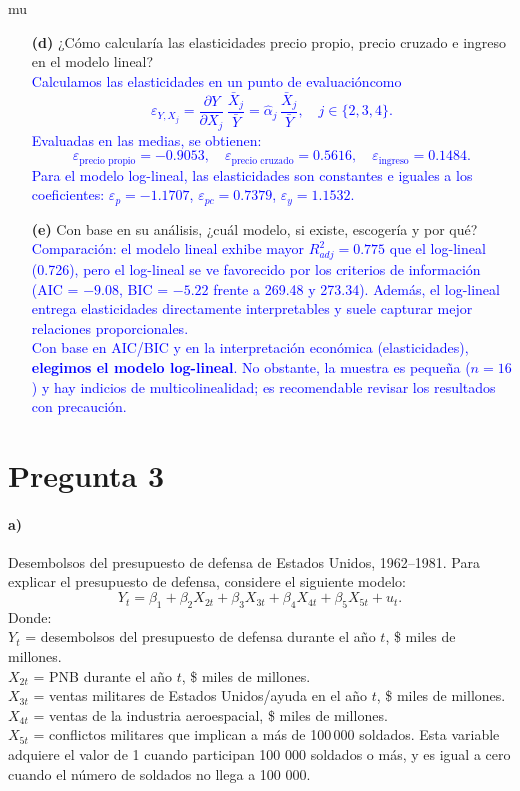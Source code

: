 mu\documentclass[10pt]{article}
\begin{document}
\begin{enumerate}
    \item[\textbf{(d)}] ¿Cómo calcularía las elasticidades precio propio, precio cruzado e ingreso en el modelo lineal?\\
    \textcolor{blue}{
        Calculamos las elasticidades en un punto de evaluacióncomo
        \[
        \varepsilon_{Y,X_j}= \frac{\partial Y}{\partial X_j}\,\frac{\bar X_j}{\bar Y}=\hat{\alpha}_j\,\frac{\bar X_j}{\bar Y},\quad j\in\{2,3,4\}.
        \]
        Evaluadas en las medias, se obtienen:
        \[
        \varepsilon_{\text{precio propio}}=-0.9053,\quad \varepsilon_{\text{precio cruzado}}=0.5616,\quad \varepsilon_{\text{ingreso}}=0.1484.
        \]
        Para el modelo log-lineal, las elasticidades son constantes e iguales a los coeficientes: \(\varepsilon_{p}=-1.1707\), \(\varepsilon_{pc}=0.7379\), \(\varepsilon_{y}=1.1532\).
    }
    
    \item[\textbf{(e)}] Con base en su análisis, ¿cuál modelo, si existe, escogería y por qué?\\
    \textcolor{blue}{
        Comparación: el modelo lineal exhibe mayor \(R^2_{adj}=0.775\) que el log-lineal (0.726), pero el log-lineal se ve favorecido por los criterios de información (AIC = \(-9.08\), BIC = \(-5.22\) frente a 269.48 y 273.34). Además, el log-lineal entrega elasticidades directamente interpretables y suele capturar mejor relaciones proporcionales.\\
        Con base en AIC/BIC y en la interpretación económica (elasticidades), \textbf{elegimos el modelo log-lineal}. No obstante, la muestra es pequeña (\(n=16\)) y hay indicios de multicolinealidad; es recomendable revisar los resultados con precaución.
    }
\end{enumerate}
\section{Pregunta 3}

\paragraph*{a)} Desembolsos del presupuesto de defensa de Estados Unidos, 1962--1981. Para explicar el presupuesto de defensa, considere el siguiente modelo:
\[
Y_t = \beta_1 + \beta_2 X_{2t} + \beta_3 X_{3t} + \beta_4 X_{4t} + \beta_5 X_{5t} + u_t.
\]
Donde: \\
$Y_t$ = desembolsos del presupuesto de defensa durante el año $t$, \$ miles de millones.\\
$X_{2t}$ = PNB durante el año $t$, \$ miles de millones.\\
$X_{3t}$ = ventas militares de Estados Unidos/ayuda en el año $t$, \$ miles de millones.\\
$X_{4t}$ = ventas de la industria aeroespacial, \$ miles de millones.\\
$X_{5t}$ = conflictos militares que implican a más de 100\,000 soldados. Esta variable adquiere el valor de 1 cuando
participan 100 000 soldados o más, y es igual a cero cuando el número de soldados no llega a 100 000. 
\end{document}
